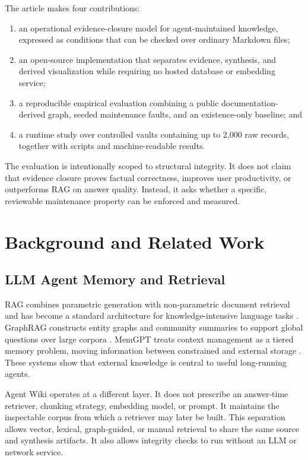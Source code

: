 \documentclass[preprint,12pt,a4paper]{elsarticle}
\begin{document}
The article makes four contributions:

\begin{enumerate}
  \item an operational evidence-closure model for agent-maintained knowledge,
  expressed as conditions that can be checked over ordinary Markdown files;
  \item an open-source implementation that separates evidence, synthesis, and
  derived visualization while requiring no hosted database or embedding
  service;
  \item a reproducible empirical evaluation combining a public documentation-
  derived graph, seeded maintenance faults, and an existence-only baseline;
  and
  \item a runtime study over controlled vaults containing up to 2,000 raw
  records, together with scripts and machine-readable results.
\end{enumerate}

The evaluation is intentionally scoped to structural integrity. It does not
claim that evidence closure proves factual correctness, improves user
productivity, or outperforms RAG on answer quality. Instead, it asks whether a
specific, reviewable maintenance property can be enforced and measured.

\section{Background and Related Work}

\subsection{LLM Agent Memory and Retrieval}

RAG combines parametric generation with non-parametric document retrieval and
has become a standard architecture for knowledge-intensive language tasks
\cite{lewis2020rag}. GraphRAG constructs entity graphs and community summaries
to support global questions over large corpora \cite{edge2024graphrag}.
MemGPT treats context management as a tiered memory problem, moving information
between constrained and external storage \cite{packer2023memgpt}. These systems
show that external knowledge is central to useful long-running agents.

Agent Wiki operates at a different layer. It does not prescribe an answer-time
retriever, chunking strategy, embedding model, or prompt. It maintains the
inspectable corpus from which a retriever may later be built. This separation
allows vector, lexical, graph-guided, or manual retrieval to share the same
source and synthesis artifacts. It also allows integrity checks to run without
an LLM or network service.
\end{document}
